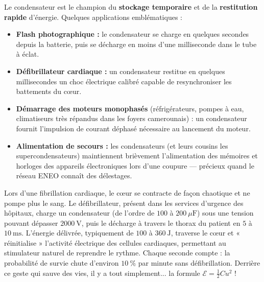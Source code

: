\documentclass[11pt]{article}
\newcounter{popsec}
\newcounter{popsub}
\newcommand{\courssub}[1]{%
  \stepcounter{popsub}%
  \par\vspace{9pt}\noindent{\popxbold\fontsize{11.5}{13}\selectfont\color{popink}{\color{poporange}\thepopsec.\thepopsub}\hspace{6pt}#1}\par\nopagebreak\vspace{4pt}
}
\begin{document}
\courssub{Applications technologiques}

Le condensateur est le champion du \textbf{stockage temporaire} et de la \textbf{restitution rapide} d'énergie. Quelques applications emblématiques :

\begin{itemize}
\item \textbf{Flash photographique :} le condensateur se charge en quelques secondes depuis la batterie, puis se décharge en moins d'une milliseconde dans le tube à éclat.
\item \textbf{Défibrillateur cardiaque :} un condensateur restitue en quelques millisecondes un choc électrique calibré capable de resynchroniser les battements du cœur.
\item \textbf{Démarrage des moteurs monophasés} (réfrigérateurs, pompes à eau, climatiseurs très répandus dans les foyers camerounais) : un condensateur fournit l'impulsion de courant déphasé nécessaire au lancement du moteur.
\item \textbf{Alimentation de secours :} les condensateurs (et leurs cousins les supercondensateurs) maintiennent brièvement l'alimentation des mémoires et horloges des appareils électroniques lors d'une coupure — précieux quand le réseau ENEO connaît des délestages.
\end{itemize}

\begin{savaistu}
Lors d'une fibrillation cardiaque, le cœur se contracte de façon chaotique et ne pompe plus le sang. Le défibrillateur, présent dans les services d'urgence des hôpitaux, charge un condensateur (de l'ordre de $100$ à $200\ \mu\mathrm{F}$) sous une tension pouvant dépasser $2000\ \mathrm{V}$, puis le décharge à travers le thorax du patient en $5$ à $10\ \mathrm{ms}$. L'énergie délivrée, typiquement de $100$ à $360\ \mathrm{J}$, traverse le cœur et « réinitialise » l'activité électrique des cellules cardiaques, permettant au stimulateur naturel de reprendre le rythme. Chaque seconde compte : la probabilité de survie chute d'environ $10\ \%$ par minute sans défibrillation. Derrière ce geste qui sauve des vies, il y a tout simplement... la formule $\mathcal{E} = \tfrac{1}{2}Cu^2$ !
\end{savaistu}
\end{document}
